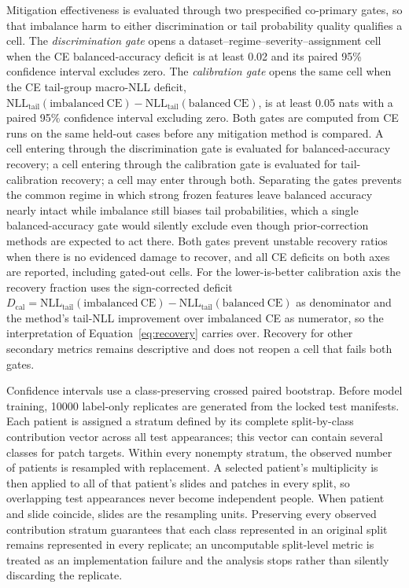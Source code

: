 \documentclass[11pt]{article}
\begin{document}
Mitigation effectiveness is evaluated through two prespecified co-primary gates, so that imbalance harm to either discrimination or tail probability quality qualifies a cell. The \emph{discrimination gate} opens a dataset--regime--severity--assignment cell when the CE balanced-accuracy deficit is at least \num{0.02} and its paired 95\% confidence interval excludes zero. The \emph{calibration gate} opens the same cell when the CE tail-group macro-NLL deficit, $\mathrm{NLL}_{\mathrm{tail}}(\mathrm{imbalanced\ CE})-\mathrm{NLL}_{\mathrm{tail}}(\mathrm{balanced\ CE})$, is at least \num{0.05} nats with a paired 95\% confidence interval excluding zero. Both gates are computed from CE runs on the same held-out cases before any mitigation method is compared. A cell entering through the discrimination gate is evaluated for balanced-accuracy recovery; a cell entering through the calibration gate is evaluated for tail-calibration recovery; a cell may enter through both. Separating the gates prevents the common regime in which strong frozen features leave balanced accuracy nearly intact while imbalance still biases tail probabilities, which a single balanced-accuracy gate would silently exclude even though prior-correction methods are expected to act there. Both gates prevent unstable recovery ratios when there is no evidenced damage to recover, and all CE deficits on both axes are reported, including gated-out cells. For the lower-is-better calibration axis the recovery fraction uses the sign-corrected deficit $D_{\mathrm{cal}}=\mathrm{NLL}_{\mathrm{tail}}(\mathrm{imbalanced\ CE})-\mathrm{NLL}_{\mathrm{tail}}(\mathrm{balanced\ CE})$ as denominator and the method's tail-NLL improvement over imbalanced CE as numerator, so the interpretation of Equation~\eqref{eq:recovery} carries over. Recovery for other secondary metrics remains descriptive and does not reopen a cell that fails both gates.

Confidence intervals use a class-preserving crossed paired bootstrap. Before model training, \num{10000} label-only replicates are generated from the locked test manifests. Each patient is assigned a stratum defined by its complete split-by-class contribution vector across all test appearances; this vector can contain several classes for patch targets. Within every nonempty stratum, the observed number of patients is resampled with replacement. A selected patient's multiplicity is then applied to all of that patient's slides and patches in every split, so overlapping test appearances never become independent people. When patient and slide coincide, slides are the resampling units. Preserving every observed contribution stratum guarantees that each class represented in an original split remains represented in every replicate; an uncomputable split-level metric is treated as an implementation failure and the analysis stops rather than silently discarding the replicate.
\end{document}
